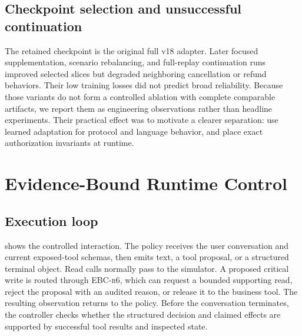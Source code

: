 \documentclass[11pt]{article}
\newcommand{\controller}{\textsc{EBC-r6}}
\begin{document}
\subsection{Checkpoint selection and unsuccessful continuation}

The retained checkpoint is the original full v18 adapter. Later focused supplementation, scenario rebalancing, and full-replay continuation runs improved selected slices but degraded neighboring cancellation or refund behaviors. Their low training losses did not predict broad reliability. Because those variants do not form a controlled ablation with complete comparable artifacts, we report them as engineering observations rather than headline experiments. Their practical effect was to motivate a clearer separation: use learned adaptation for protocol and language behavior, and place exact authorization invariants at runtime.

\section{Evidence-Bound Runtime Control}
\label{sec:controller}

\subsection{Execution loop}

 shows the controlled interaction. The policy receives the user conversation and current exposed-tool schemas, then emits text, a tool proposal, or a structured terminal object. Read calls normally pass to the simulator. A proposed critical write is routed through \controller, which can request a bounded supporting read, reject the proposal with an audited reason, or release it to the business tool. The resulting observation returns to the policy. Before the conversation terminates, the controller checks whether the structured decision and claimed effects are supported by successful tool results and inspected state.
\end{document}
